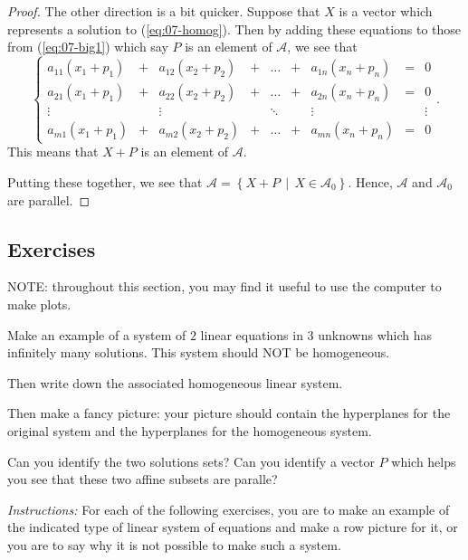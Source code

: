 \documentclass[elementsmain.tex]{subfiles}
\begin{document}
\begin{proof}
The other direction is a bit quicker. Suppose that $X$ is a vector which represents a solution to (\ref{eq:07-homog}). Then by adding these equations to those from (\ref{eq:07-big1}) which say $P$ is an element of $\mathcal{A}$, we see that 
\begin{equation*}
\left\{
\begin{array}{ccccccccc}
a_{11} (x_1+p_1) & + & a_{12} (x_2+p_2) & + & \dots & + & a_{1n} (x_n+p_n) & = & 0 \\
a_{21} (x_1+p_1) & + & a_{22} (x_2+p_2) & + & \dots & + & a_{2n} (x_n+p_n) & = & 0 \\
\vdots     &   & \vdots     &   & \ddots &  & \vdots     &  & \vdots \\ 
a_{m1} (x_1+p_1) & + & a_{m2} (x_2+p_2) & + & \dots & + & a_{mn} (x_n+p_n) & = & 0 
\end{array}\right. .
\end{equation*}
This means that $X+P$ is an element of $\mathcal{A}$.

Putting these together, we see that $\mathcal{A} = \left\{ X + P \,\middle|\, X \in \mathcal{A}_0 \right\}$. Hence, $\mathcal{A}$ and $\mathcal{A}_0$ are parallel.
\end{proof}

\clearpage

\subsection*{Exercises}

NOTE: throughout this section, you may find it useful to use the computer to make plots.

\begin{exercise}
Make an example of a system of $2$ linear equations in $3$ unknowns which has infinitely many solutions. This system should NOT be homogeneous.

Then write down the associated homogeneous linear system.

Then make a fancy picture: your picture should contain the hyperplanes for the original system and the hyperplanes for the homogeneous system.

Can you identify the two solutions sets? Can you identify a vector $P$ which helps you see that these two affine subsets are paralle?
\end{exercise}

\noindent
\textit{Instructions:} For each of the following exercises, you are to make an example of the indicated type of linear system of equations and make a row picture for it, or you are to say why it is not possible to make such a system. 
\end{document}
